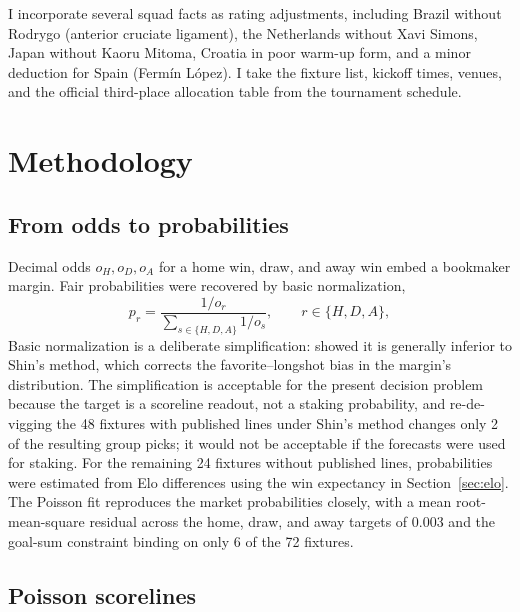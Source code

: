 \documentclass[11pt,letterpaper]{article}
\begin{document}
I incorporate several squad facts as rating adjustments, including Brazil without Rodrygo (anterior cruciate ligament), the Netherlands without Xavi Simons, Japan without Kaoru Mitoma, Croatia in poor warm-up form, and a minor deduction for Spain (Fermín López). I take the fixture list, kickoff times, venues, and the official third-place allocation table from the tournament schedule.

\section{Methodology}\label{sec:method}

\subsection{From odds to probabilities}

Decimal odds $o_H, o_D, o_A$ for a home win, draw, and away win embed a bookmaker margin. Fair probabilities were recovered by basic normalization,
\begin{equation}
p_r = \frac{1/o_r}{\sum_{s \in \{H,D,A\}} 1/o_s}, \qquad r \in \{H,D,A\},
\end{equation}
Basic normalization is a deliberate simplification: \citet{strumbelj2014} showed it is generally inferior to Shin's method, which corrects the favorite--longshot bias in the margin's distribution. The simplification is acceptable for the present decision problem because the target is a scoreline readout, not a staking probability, and re-de-vigging the 48 fixtures with published lines under Shin's method changes only 2 of the resulting group picks; it would not be acceptable if the forecasts were used for staking. For the remaining 24 fixtures without published lines, probabilities were estimated from Elo differences using the win expectancy in Section~\ref{sec:elo}. The Poisson fit reproduces the market probabilities closely, with a mean root-mean-square residual across the home, draw, and away targets of 0.003 and the goal-sum constraint binding on only 6 of the 72 fixtures.

\subsection{Poisson scorelines}
\end{document}
